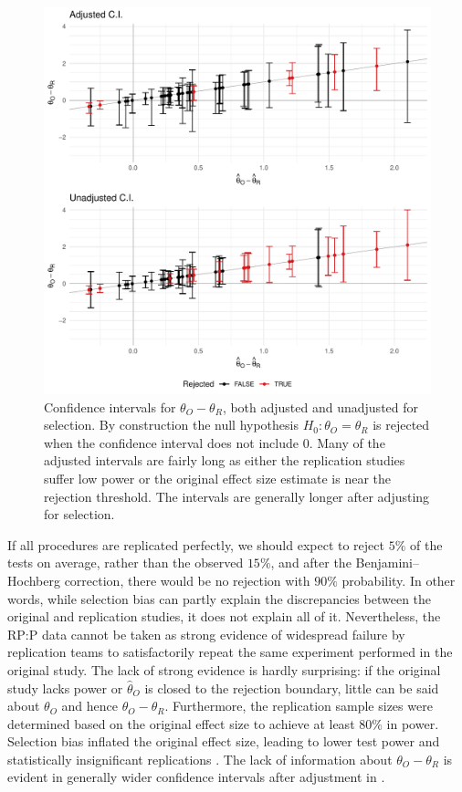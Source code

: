 \documentclass[11pt]{article}
\theoremstyle{definition}
\theoremstyle{custom}
\newcommand{\htheta}{\hat{\theta}}
\begin{document}
  \begin{figure}[htbp]
    \centering
    \includegraphics[width=\hsize]{ci}
    \caption{Confidence intervals for $\theta_O - \theta_R$, both adjusted and unadjusted for selection. By construction the null hypothesis $H_0: \theta_O = \theta_R$ is rejected when the confidence interval does not include $0$. Many of the adjusted intervals are fairly long as either the replication studies suffer low power or the original effect size estimate is near the rejection threshold. The intervals are generally longer after adjusting for selection.}
  \label{fig:ci}
  \end{figure}

  If all procedures are replicated perfectly, we should expect to reject $5\%$ of the tests on average, rather than the observed $15\%$, and after the Benjamini--Hochberg correction, there would be no rejection with $90\%$ probability. In other words, while selection bias can partly explain the discrepancies between the original and replication studies, it does not explain all of it. Nevertheless, the RP:P data cannot be taken as strong evidence of widespread failure by replication teams to satisfactorily repeat the same experiment performed in the original study. The lack of strong evidence is hardly surprising: if the original study lacks power \citep{Morey:2017} or $\htheta_O$ is closed to the rejection boundary, little can be said about $\theta_O$ and hence $\theta_O - \theta_R$. Furthermore, the replication sample sizes were determined based on the original effect size to achieve at least $80\%$ in power. Selection bias inflated the original effect size, leading to lower test power and statistically insignificant replications \citep{Etz:2016gx,Camerer:2018de}. The lack of information about $\theta_O - \theta_R$ is evident in generally wider confidence intervals after adjustment in .
\end{document}
